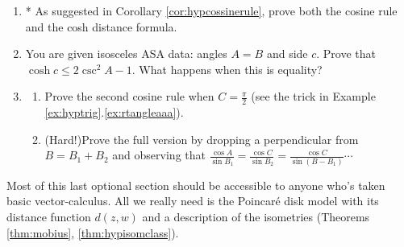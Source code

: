 \begin{exercises}
\begin{enumerate}
		 
		\item* As suggested in Corollary \ref{cor:hypcossinerule}, prove both the cosine rule and the cosh distance formula.
	
		
		\item You are given isosceles ASA data: angles $A=B$ and side $c$. Prove that $\cosh c\le 2\csc^2A-1$. What happens when this is equality?
		
				
 		\item\label{exs:hcosruleII}
 		\begin{enumerate}
		  \item Prove the second cosine rule when $C=\frac\pi 2$ (see the trick in Example \ref*{ex:hyptrig}.\ref{ex:rtangleaaa}).
		  \item (Hard!)\lstsp Prove the full version by dropping a perpendicular from $B=B_1+B_2$ and observing that $\frac{\cos A}{\sin B_1}=\frac{\cos C}{\sin B_2}=\frac{\cos C}{\sin(B-B_1)}\cdots$
		\end{enumerate}
	\end{enumerate}
\end{exercises}

\vspace{-5pt}



\goodbreak


\label{pg:hyp1stform}

Most of this last optional section should be accessible to anyone who's taken basic vector-calculus. All we really need is the Poincaré disk model with its distance function $d(z,w)$ and a description of the isometries (Theorems \ref{thm:mobius}, \ref{thm:hypisomclass}).\smallbreak

